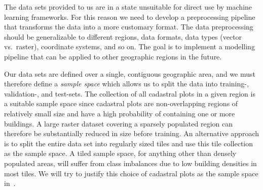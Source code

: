 The data sets provided to us are in a state unsuitable for direct use by machine learning frameworks.
For this reason we need to develop a preprocessing pipeline that transforms the data into a more customary format.
The data preprocessing should be generalizable to different regions, data formats, data types (vector vs.\ raster), coordinate systems, and so on.
The goal is to implement a modelling pipeline that can be applied to other geographic regions in the future.

Our data sets are defined over a single, contiguous geographic area, and we must therefore define a \textit{sample space} which allows us to split the data into training-, validation-, and test-sets.
The collection of all cadastral plots in a given region is a suitable sample space since cadastral plots are non-overlapping regions of relatively small size and have a high probability of containing one or more buildings.
A large raster dataset covering a sparsely populated region can therefore be substantially reduced in size before training.
An alternative approach is to split the entire data set into regularly sized tiles and use this tile collection as the sample space.
A tiled sample space, for anything other than densely populated areas, will suffer from class imbalances due to low building densities in most tiles.
We will try to justify this choice of cadastral plots as the sample space in~.
